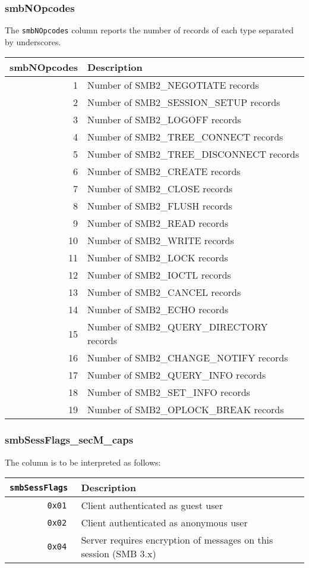 \documentclass[documentation]{subfiles}
\begin{document}
\subsubsection{smbNOpcodes}\label{smbNOpcodes}
The {\tt smbNOpcodes} column reports the number of records of each type separated by underscores.
\begin{longtable}{rl}
    \toprule
    {\bf smbNOpcodes} & {\bf Description}\\
    \midrule\endhead%
    1  & Number of SMB2\_NEGOTIATE records\\
    2  & Number of SMB2\_SESSION\_SETUP records\\
    3  & Number of SMB2\_LOGOFF records\\
    4  & Number of SMB2\_TREE\_CONNECT records\\
    5  & Number of SMB2\_TREE\_DISCONNECT records\\
    6  & Number of SMB2\_CREATE records\\
    7  & Number of SMB2\_CLOSE records\\
    8  & Number of SMB2\_FLUSH records\\
    9  & Number of SMB2\_READ records\\
    10 & Number of SMB2\_WRITE records\\
    11 & Number of SMB2\_LOCK records\\
    12 & Number of SMB2\_IOCTL records\\
    13 & Number of SMB2\_CANCEL records\\
    14 & Number of SMB2\_ECHO records\\
    15 & Number of SMB2\_QUERY\_DIRECTORY records\\
    16 & Number of SMB2\_CHANGE\_NOTIFY records\\
    17 & Number of SMB2\_QUERY\_INFO records\\
    18 & Number of SMB2\_SET\_INFO records\\
    19 & Number of SMB2\_OPLOCK\_BREAK records\\
    \bottomrule
\end{longtable}

\subsubsection{smbSessFlags\_secM\_caps}\label{smbSessFlagsSecMCaps}
The {\tt{}} column is to be interpreted as follows:

\begin{longtable}{>{\tt}rl}
    \toprule
    {\bf smbSessFlags} & {\bf Description}\\
    \midrule\endhead%
    0x01 & Client authenticated as guest user\\
    0x02 & Client authenticated as anonymous user\\
    0x04 & Server requires encryption of messages on this session (SMB 3.x)\\
    \bottomrule
\end{longtable}
\end{document}
